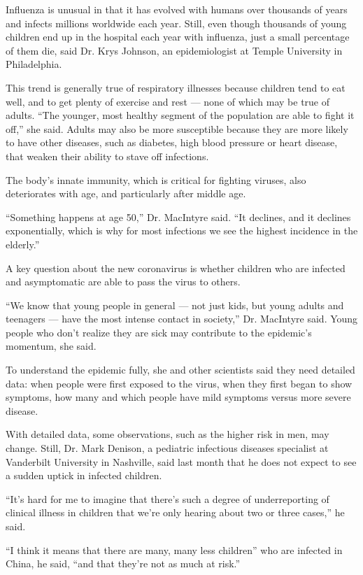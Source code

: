 Influenza is unusual in that it has evolved with humans over thousands
of years and infects millions worldwide each year. Still, even though
thousands of young children end up in the hospital each year with
influenza, just a small percentage of them die, said Dr. Krys Johnson,
an epidemiologist at Temple University in Philadelphia.

This trend is generally true of respiratory illnesses because children
tend to eat well, and to get plenty of exercise and rest --- none of
which may be true of adults. ``The younger, most healthy segment of the
population are able to fight it off,'' she said. Adults may also be more
susceptible because they are more likely to have other diseases, such as
diabetes, high blood pressure or heart disease, that weaken their
ability to stave off infections.

The body's innate immunity, which is critical for fighting viruses, also
deteriorates with age, and particularly after middle age.

``Something happens at age 50,'' Dr. MacIntyre said. ``It declines, and
it declines exponentially, which is why for most infections we see the
highest incidence in the elderly.''

A key question about the new coronavirus is whether children who are
infected and asymptomatic are able to pass the virus to others.

``We know that young people in general --- not just kids, but young
adults and teenagers --- have the most intense contact in society,'' Dr.
MacIntyre said. Young people who don't realize they are sick may
contribute to the epidemic's momentum, she said.

To understand the epidemic fully, she and other scientists said they
need detailed data: when people were first exposed to the virus, when
they first began to show symptoms, how many and which people have mild
symptoms versus more severe disease.

With detailed data, some observations, such as the higher risk in men,
may change. Still, Dr. Mark Denison, a pediatric infectious diseases
specialist at Vanderbilt University in Nashville, said last month that
he does not expect to see a sudden uptick in infected children.

``It's hard for me to imagine that there's such a degree of
underreporting of clinical illness in children that we're only hearing
about two or three cases,'' he said.

``I think it means that there are many, many less children'' who are
infected in China, he said, ``and that they're not as much at risk.''

